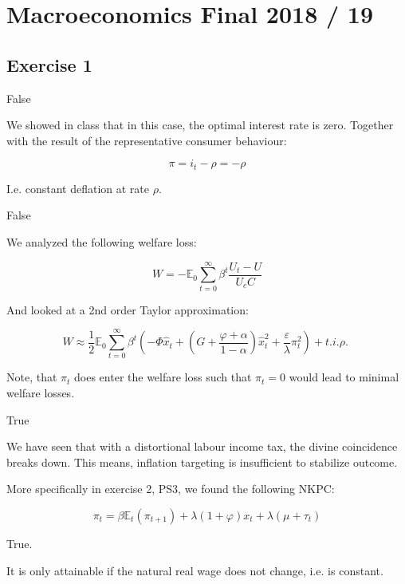 \section{Macroeconomics Final 2018 / 19}

{
\subsection*{Exercise 1}

\begin{enumerate}[label=(\alph*)]
{\item 
False

We showed in class that in this case, the optimal interest rate is zero. Together with the result of the representative consumer behaviour:

$$
\pi=i_{t}-\rho=-\rho
$$

I.e. constant deflation at rate $\rho$.
}
{
\item 
False

We analyzed the following welfare loss:

$$
W=-\mathbb{E}_{0} \sum_{t=0}^{\infty} \beta^{t} \frac{U_{t}-U}{U_{c} C}
$$

And looked at a 2nd order Taylor approximation:

$$
W \approx \frac{1}{2} \mathbb{E}_{0} \sum_{t=0}^{\infty} \beta^{t}\left(-\Phi \hat{x}_{t}+\left(G+\frac{\varphi+\alpha}{1-\alpha}\right) \hat{x}_{t}^{2}+\frac{\varepsilon}{\lambda} \pi_{t}^{2}\right)+t . i . \rho \text {. }
$$

Note, that $\pi_{t}$ does enter the welfare loss such that $\pi_{t}=0$ would lead to minimal welfare losses.
}
{
\item 
True

We have seen that with a distortional labour income tax, the divine coincidence breaks down. This means, inflation targeting is insufficient to stabilize outcome.

More specifically in exercise 2, PS3, we found the following NKPC:

$$
\pi_{t}=\beta \mathbb{E}_{t}\left(\pi_{t+1}\right)+\lambda(1+\varphi) x_{t}+\lambda\left(\mu+\tau_{t}\right)
$$
}
{
\item 
True.

It is only attainable if the natural real wage does not change, i.e. is constant.
}
\end{enumerate}
}
